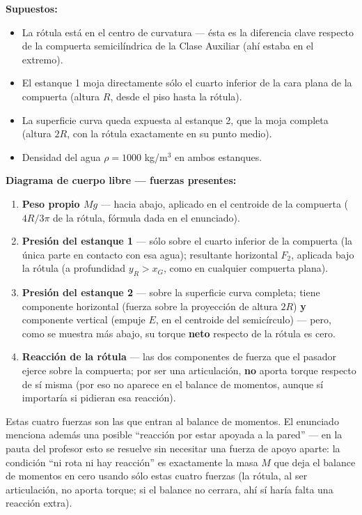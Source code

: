 \documentclass[11pt]{article}
\newenvironment{supuestos}{%
  \noindent\textbf{Supuestos:}
  \begin{itemize}[leftmargin=1.4em, itemsep=1pt]
}{%
  \end{itemize}
}
\newenvironment{dcl}{%
  \noindent\textbf{Diagrama de cuerpo libre --- fuerzas presentes:}
  \begin{enumerate}[leftmargin=1.6em, itemsep=2pt, label=\arabic*.]
}{%
  \end{enumerate}
}
\begin{document}
\begin{supuestos}
\item La r\'otula est\'a en el centro de curvatura --- \'esta es la diferencia clave
respecto de la compuerta semicil\'indrica de la Clase Auxiliar (ah\'i estaba en el
extremo).
\item El estanque 1 moja directamente s\'olo el cuarto inferior de la cara plana de la
compuerta (altura $R$, desde el piso hasta la r\'otula).
\item La superficie curva queda expuesta al estanque 2, que la moja completa (altura
$2R$, con la r\'otula exactamente en su punto medio).
\item Densidad del agua $\rho=1000$ kg/m$^3$ en ambos estanques.
\end{supuestos}

\begin{dcl}
\item \textbf{Peso propio $Mg$} --- hacia abajo, aplicado en el centroide de la
compuerta ($4R/3\pi$ de la r\'otula, f\'ormula dada en el enunciado).
\item \textbf{Presi\'on del estanque 1} --- s\'olo sobre el cuarto inferior de la
compuerta (la \'unica parte en contacto con esa agua); resultante horizontal $F_2$,
aplicada bajo la r\'otula (a profundidad $y_R>x_G$, como en cualquier compuerta plana).
\item \textbf{Presi\'on del estanque 2} --- sobre la superficie curva completa; tiene
componente horizontal (fuerza sobre la proyecci\'on de altura $2R$) \textbf{y}
componente vertical (empuje $E$, en el centroide del semic\'irculo) --- pero, como se
muestra m\'as abajo, su torque \textbf{neto} respecto de la r\'otula es cero.
\item \textbf{Reacci\'on de la r\'otula} --- las dos componentes de fuerza que el
pasador ejerce sobre la compuerta; por ser una articulaci\'on, \textbf{no} aporta
torque respecto de s\'i misma (por eso no aparece en el balance de momentos, aunque s\'i
importar\'ia si pidieran esa reacci\'on).
\end{dcl}
Estas cuatro fuerzas son las que entran al balance de momentos. El enunciado menciona
adem\'as una posible ``reacci\'on por estar apoyada a la pared'' --- en la pauta del
profesor esto se resuelve sin necesitar una fuerza de apoyo aparte: la condici\'on
``ni rota ni hay reacci\'on'' es exactamente la masa $M$ que deja el balance de
momentos en cero usando s\'olo estas cuatro fuerzas (la r\'otula, al ser articulaci\'on,
no aporta torque; si el balance no cerrara, ah\'i s\'i har\'ia falta una reacci\'on
extra).
\end{document}
